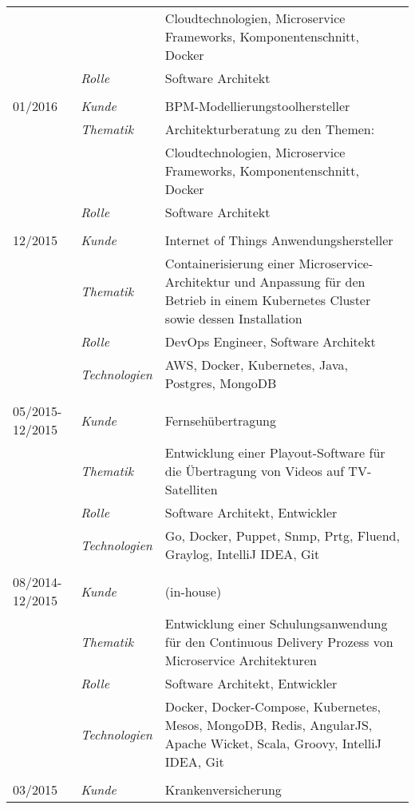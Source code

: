 \begin{longtable}{@{}>{}p{4cm}>{\itshape}p{2cm}>{}p{9cm}}
\nopagebreak		&           	& Cloudtechnologien, Microservice Frameworks, Komponentenschnitt, Docker\\
\nopagebreak		& Rolle 	    & Software Architekt\\
\\
01/2016             & Kunde 	    & BPM-Modellierungstoolhersteller\\
\nopagebreak		& Thematik	    & Architekturberatung zu den Themen:\\
\nopagebreak		&           	& Cloudtechnologien, Microservice Frameworks, Komponentenschnitt, Docker\\
\nopagebreak		& Rolle 	    & Software Architekt\\
\\
12/2015             & Kunde 	    & Internet of Things Anwendungshersteller\\
\nopagebreak		& Thematik	    & Containerisierung einer Microservice-Architektur und Anpassung für den Betrieb in einem Kubernetes Cluster sowie dessen Installation\\
\nopagebreak		& Rolle 	    & DevOps Engineer, Software Architekt\\
\nopagebreak		& Technologien	& AWS, Docker, Kubernetes, Java, Postgres, MongoDB\\
\\
05/2015-12/2015     & Kunde 	    & Fernsehübertragung\\
\nopagebreak		& Thematik	    & Entwicklung einer Playout-Software für die Übertragung von Videos auf TV-Satelliten\\
\nopagebreak		& Rolle 	    & Software Architekt, Entwickler\\
\nopagebreak		& Technologien	& Go, Docker, Puppet, Snmp, Prtg, Fluend, Graylog, IntelliJ IDEA, Git\\
\\
08/2014-12/2015     & Kunde 	    & (in-house)\\
\nopagebreak		& Thematik	    & Entwicklung einer Schulungsanwendung für den Continuous Delivery Prozess von Microservice Architekturen\\
\nopagebreak		& Rolle 	    & Software Architekt, Entwickler\\
\nopagebreak		& Technologien	& Docker, Docker-Compose, Kubernetes, Mesos, MongoDB, Redis, AngularJS, Apache Wicket, Scala, Groovy, IntelliJ IDEA, Git\\
\\
03/2015             & Kunde 	    & Krankenversicherung\\

\end{longtable}
